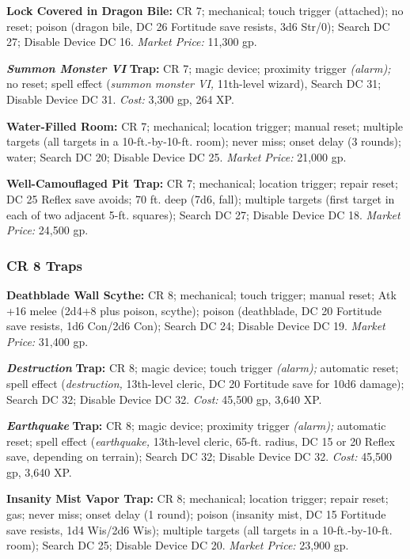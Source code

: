 \documentclass{article}
\begin{document}
\textbf{Lock Covered in Dragon Bile: }CR 7; mechanical; touch trigger (attached); 
no reset; poison (dragon bile, DC 26 Fortitude save resists, 3d6 Str/0); Search 
DC 27; Disable Device DC 16. \textit{Market Price: }11,300 gp.

\textit{\textbf{Summon Monster VI }}\textbf{Trap:} CR 7; magic device; proximity 
trigger \textit{(alarm); }no reset; spell effect (\textit{summon monster VI, }11th-level 
wizard), Search DC 31; Disable Device DC 31. \textit{Cost: }3,300 gp, 264 XP.

\textbf{Water-Filled Room:} CR 7; mechanical; location trigger; manual reset; multiple 
targets (all targets in a 10-ft.-by-10-ft. room); never miss; onset delay (3 rounds); 
water; Search DC 20; Disable Device DC 25. \textit{Market Price: }21,000 gp. 

\textbf{Well-Camouflaged Pit Trap:} CR 7; mechanical; location trigger; repair 
reset; DC 25 Reflex save avoids; 70 ft. deep (7d6, fall); multiple targets (first 
target in each of two adjacent 5-ft. squares); Search DC 27; Disable Device DC 
18. \textit{Market Price: }24,500 gp. 

\vspace{12pt}
\subsubsection*{\textbf{CR 8 Traps}}

\textbf{Deathblade Wall Scythe:} CR 8; mechanical; touch trigger; manual reset; 
Atk +16 melee (2d4+8 plus poison, scythe); poison (deathblade, DC 20 Fortitude 
save resists, 1d6 Con/2d6 Con); Search DC 24; Disable Device DC 19. \textit{Market 
Price: }31,400 gp.

\textit{\textbf{Destruction }}\textbf{Trap:} CR 8; magic device; touch trigger 
\textit{(alarm); }automatic reset; spell effect (\textit{destruction, }13th-level 
cleric, DC 20 Fortitude save for 10d6 damage); Search DC 32; Disable Device DC 
32. \textit{Cost: }45,500 gp, 3,640 XP.

\textit{\textbf{Earthquake }}\textbf{Trap: }CR 8; magic device; proximity trigger 
\textit{(alarm); }automatic reset; spell effect (\textit{earthquake, }13th-level 
cleric, 65-ft. radius, DC 15 or 20 Reflex save, depending on terrain); Search DC 
32; Disable Device DC 32. \textit{Cost: }45,500 gp, 3,640 XP.

\textbf{Insanity Mist Vapor Trap:} CR 8; mechanical; location trigger; repair reset; 
gas; never miss; onset delay (1 round); poison (insanity mist, DC 15 Fortitude 
save resists, 1d4 Wis/2d6 Wis); multiple targets (all targets in a 10-ft.-by-10-ft. 
room); Search DC 25; Disable Device DC 20. \textit{Market Price: }23,900 gp.
\end{document}
